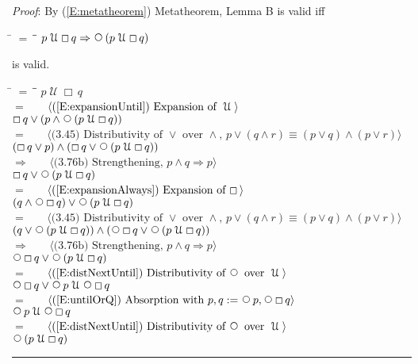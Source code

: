 \documentclass[12pt, fleqn, leqno]{article}
\newcommand{\lgap}{2pt}                             %
\newcommand{\mymathindent}{24pt}                    %
\newcommand{\impl}{\ensuremath{\Rightarrow}}        %
\newcommand{\Until}{\;\mathcal{U}\;}
\newcommand{\Next}{\;\,\text{\raisebox{3.5pt}{\circle{6}}}}
\newcommand{\Always}{\Box\,}
\newcommand{\myqed}{\rule[-.23ex]{1.2ex}{2.0ex}}
\newcommand{\myqedtab}{\hspace{384pt}}              %
\newcommand{\Gll} {\langle}                         %
\newcommand{\Ggg} {\rangle}                         %
\newcommand{\Hint}[1]     {\ \ \ $\Gll              \mbox{#1} \Ggg$ }   %
\begin{document}
{\emph{Proof}: By (\ref{E:metatheorem}) Metatheorem, Lemma B is valid iff
\begin{tabbing}
\hspace{\mymathindent} \= $= \;$ \= \myqedtab \= \kill
\> \> $p \Until \Always q \impl \Next (p \Until \Always q)$
\end{tabbing}
is valid.
\begin{tabbing}
\hspace{\mymathindent} \= $= \;$ \= \myqedtab \= \kill
  \> \>   $p \Until \Always q$\\[\lgap]
   \> $=$  \>  \Hint{(\ref{E:expansionUntil}) Expansion of $\Until$}\\[\lgap]
  \> \>   $\Always q \lor (p \land \Next(p \Until \Always q))$\\[\lgap]
  \> $=$ \> \Hint{(3.45) Distributivity of $\lor$ over $\land$, $p\lor (q\land r) \equiv (p\lor q) \land (p\lor r)$} \\[\lgap]
\> \> $(\Always q\lor p) \land (\Always q\lor \Next (p \Until \Always q))$\\[\lgap]
\> $\impl$ \> \Hint{(3.76b) Strengthening, $p\land q \impl p$} \\[\lgap]
\> \> $\Always q \lor \Next (p \Until \Always q)$\\[\lgap]
\> $=$  \>  \Hint{(\ref{E:expansionAlways}) Expansion of $\Always$}\\[\lgap]
\> \> $(q \land \Next \Always q) \lor \Next (p \Until \Always q)$\\[\lgap]
\> $=$ \> \Hint{(3.45) Distributivity of $\lor$ over $\land$, $p\lor (q\land r) \equiv (p\lor q) \land (p\lor r)$} \\[\lgap]
\> \> $(q \lor  \Next (p \Until \Always q)) \land (\Next \Always q \lor  \Next (p \Until \Always q))$\\[\lgap]
\> $\impl$ \> \Hint{(3.76b) Strengthening, $p\land q \impl p$} \\[\lgap]
\> \> $ \Next \Always q \lor  \Next (p \Until \Always q)$\\[\lgap]
\> $=$  \>  \Hint{(\ref{E:distNextUntil}) Distributivity of $\Next$ over $\Until$}\\[\lgap]
\> \> $ \Next \Always q \lor  \Next p \Until \Next \Always q$\\[\lgap]
\> $=$ \> \Hint{(\ref{E:untilOrQ}) Absorption with $p,q := \Next p, \Next \Always q$} \\[\lgap]
\> \> $ \Next p \Until \Next \Always q$\\[\lgap]
\> $=$  \>  \Hint{(\ref{E:distNextUntil}) Distributivity of $\Next$ over $\Until$}\\[\lgap]
\> \> $ \Next (p \Until \Always q)$ \quad \myqed
\end{tabbing}
}
\end{document}

